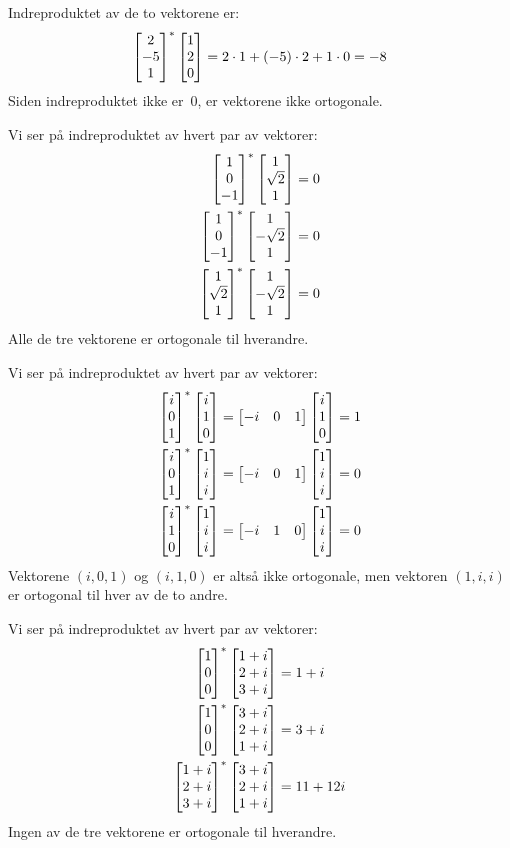 \begin{losning}
\begin{punkt}
Indreproduktet av de to vektorene er:
\[
\begin{bmatrix} 2 \\ -5 \\ 1 \end{bmatrix}^*
\begin{bmatrix} 1 \\ 2 \\ 0 \end{bmatrix}
= 2 \cdot 1 + (-5) \cdot 2 + 1 \cdot 0 = -8
\]
Siden indreproduktet ikke er~$0$, er vektorene ikke ortogonale.
\end{punkt}

\begin{punkt}
Vi ser på indreproduktet av hvert par av vektorer:
\begin{align*}
\begin{bmatrix} 1 \\ 0 \\ -1 \end{bmatrix}^* \begin{bmatrix} 1 \\ \sqrt{2} \\ 1 \end{bmatrix}  &= 0 \\
\begin{bmatrix} 1 \\ 0 \\ -1 \end{bmatrix}^* \begin{bmatrix} 1 \\ -\sqrt{2} \\ 1 \end{bmatrix} &= 0 \\
\begin{bmatrix} 1 \\ \sqrt{2} \\ 1 \end{bmatrix}^* \begin{bmatrix} 1 \\ -\sqrt{2} \\ 1 \end{bmatrix} &= 0
\end{align*}
Alle de tre vektorene er ortogonale til hverandre.
\end{punkt}

\begin{punkt}
Vi ser på indreproduktet av hvert par av vektorer:
\begin{align*}
\begin{bmatrix} i \\ 0 \\ 1 \end{bmatrix}^* \begin{bmatrix} i \\ 1 \\ 0 \end{bmatrix}
&= \begin{bmatrix} -i & 0 & 1 \end{bmatrix} \begin{bmatrix} i \\ 1 \\ 0 \end{bmatrix}
 = 1 \\
\begin{bmatrix} i \\ 0 \\ 1 \end{bmatrix}^* \begin{bmatrix} 1 \\ i \\ i \end{bmatrix}
&= \begin{bmatrix} -i & 0 & 1 \end{bmatrix} \begin{bmatrix} 1 \\ i \\ i \end{bmatrix}
 = 0 \\
\begin{bmatrix} i \\ 1 \\ 0 \end{bmatrix}^* \begin{bmatrix} 1 \\ i \\ i \end{bmatrix}
&= \begin{bmatrix} -i & 1 & 0 \end{bmatrix} \begin{bmatrix} 1 \\ i \\ i \end{bmatrix}
 = 0
\end{align*}
Vektorene $(i,0,1)$ og $(i,1,0)$ er altså ikke ortogonale,
men vektoren $(1,i,i)$ er ortogonal til hver av de to andre.
\end{punkt}

\begin{punkt}
Vi ser på indreproduktet av hvert par av vektorer:
\begin{align*}
\begin{bmatrix} 1 \\ 0 \\ 0 \end{bmatrix}^* \begin{bmatrix} 1+i \\ 2+i \\ 3+i \end{bmatrix} &= 1 + i \\
\begin{bmatrix} 1 \\ 0 \\ 0 \end{bmatrix}^* \begin{bmatrix} 3+i \\ 2+i \\ 1+i \end{bmatrix} &= 3 + i \\
\begin{bmatrix} 1+i \\ 2+i \\ 3+i \end{bmatrix}^* \begin{bmatrix} 3+i \\ 2+i \\ 1+i \end{bmatrix} &= 11 + 12i
\end{align*}
Ingen av de tre vektorene er ortogonale til hverandre.
\end{punkt}
\end{losning}


